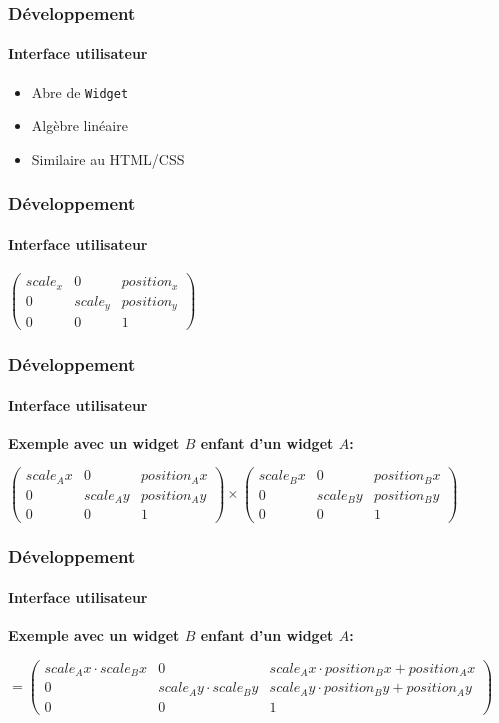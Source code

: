 \begin{frame}
	\frametitle{Développement}
	\framesubtitle{Interface utilisateur}

	\begin{itemize}
		\item Abre de \lstinline{Widget}
		\item Algèbre linéaire
		\item Similaire au HTML/CSS
	\end{itemize}
\end{frame}

\begin{frame}
	\frametitle{Développement}
	\framesubtitle{Interface utilisateur}
	\centering

	\begin{math}
	\begin{pmatrix}
		scale_x & 0       & position_x \\
		0       & scale_y & position_y \\
		0       & 0       & 1
	\end{pmatrix}
	\end{math}
\end{frame}

\begin{frame}
	\frametitle{Développement}
	\framesubtitle{Interface utilisateur}
	\centering

	\textbf{Exemple avec un widget $B$ enfant d'un widget $A$:}
	\vfill

	\begin{math}
	\begin{pmatrix}
		scale_Ax & 0       & position_Ax \\
		0       & scale_Ay & position_Ay \\
		0       & 0       & 1
	\end{pmatrix}
	\times
	\begin{pmatrix}
		scale_Bx & 0       & position_Bx \\
		0       & scale_By & position_By \\
		0       & 0       & 1
	\end{pmatrix}
	\end{math}
\end{frame}

\begin{frame}
	\frametitle{Développement}
	\framesubtitle{Interface utilisateur}
	\centering
	\textbf{Exemple avec un widget $B$ enfant d'un widget $A$:}
	\vfill

	\begin{math}
	=
	\begin{pmatrix}
		scale_Ax \cdot scale_Bx & 0 & scale_Ax \cdot position_Bx + position_Ax \\
		0       & scale_Ay \cdot scale_By & scale_Ay \cdot position_By + position_Ay \\
		0       & 0       & 1
	\end{pmatrix}
	\end{math}
\end{frame}

